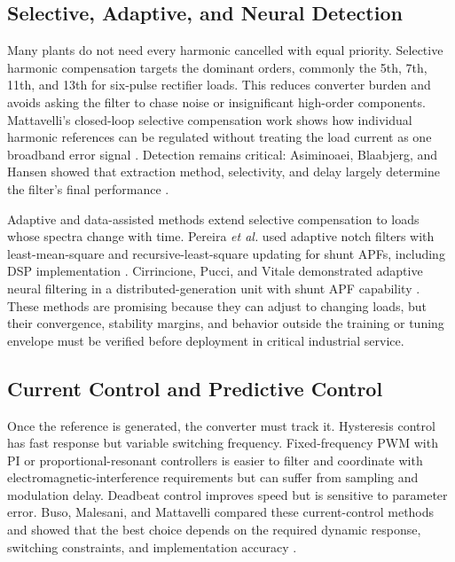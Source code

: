 \documentclass[conference]{IEEEtran}
\begin{document}
\subsection{Selective, Adaptive, and Neural Detection}
Many plants do not need every harmonic cancelled with equal priority. Selective harmonic compensation targets the dominant orders, commonly the 5th, 7th, 11th, and 13th for six-pulse rectifier loads. This reduces converter burden and avoids asking the filter to chase noise or insignificant high-order components. Mattavelli's closed-loop selective compensation work shows how individual harmonic references can be regulated without treating the load current as one broadband error signal \cite{Mattavelli2001}. Detection remains critical: Asiminoaei, Blaabjerg, and Hansen showed that extraction method, selectivity, and delay largely determine the filter's final performance \cite{Asiminoaei2007}.

Adaptive and data-assisted methods extend selective compensation to loads whose spectra change with time. Pereira \textit{et al.} used adaptive notch filters with least-mean-square and recursive-least-square updating for shunt APFs, including DSP implementation \cite{Pereira2011}. Cirrincione, Pucci, and Vitale demonstrated adaptive neural filtering in a distributed-generation unit with shunt APF capability \cite{Cirrincione2008}. These methods are promising because they can adjust to changing loads, but their convergence, stability margins, and behavior outside the training or tuning envelope must be verified before deployment in critical industrial service.

\subsection{Current Control and Predictive Control}
Once the reference is generated, the converter must track it. Hysteresis control has fast response but variable switching frequency. Fixed-frequency PWM with PI or proportional-resonant controllers is easier to filter and coordinate with electromagnetic-interference requirements but can suffer from sampling and modulation delay. Deadbeat control improves speed but is sensitive to parameter error. Buso, Malesani, and Mattavelli compared these current-control methods and showed that the best choice depends on the required dynamic response, switching constraints, and implementation accuracy \cite{Buso1998}.
\end{document}
